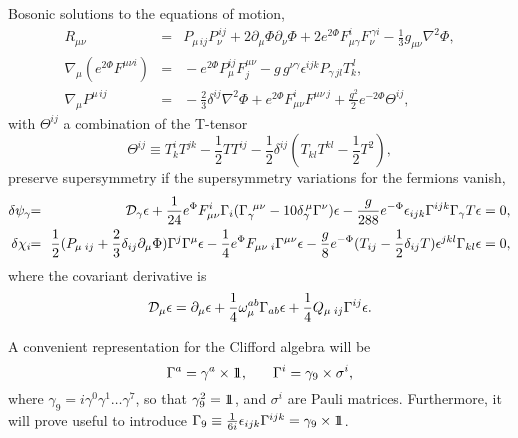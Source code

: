 \documentclass[12pt,a4paper]{article}
\begin{document}
Bosonic solutions to the equations of motion, 
\begin{eqnarray}
R_{\mu \nu} \! \! & = & \! \! P_{\mu \, ij} P_{\nu}^{\, ij} + 2 \partial_{\mu} \Phi \partial_{\nu} 
\Phi + 2 e^{2 \Phi} F_{\mu \gamma}^{i} F_{\nu}^{\, \gamma i} - \frac {1}{3} g_{\mu \nu} 
\nabla^2 \Phi, \nonumber \\
\nabla_{\mu}(e^{2 \Phi}F^{\mu \nu i}) \! \! & = & \! \! -e^{2 \Phi} P_{\mu}^{ij} F_j^{\mu \nu} - 
g \, g^{\nu \gamma} \epsilon^{ijk} P_{\gamma \, jl} T_k^{\, l}, \nonumber \\
\nabla_{\mu} P^{\mu \, ij} \! \! & = & \! \! - \frac {2}{3} \delta^{ij} \nabla^2 \Phi + 
e^{2 \Phi} F_{\mu \nu}^{i} F^{\mu \nu \, j} + \frac {g^2}{2} e^{-2 \Phi} \Theta^{ij},
\end{eqnarray}
with $\Theta^{ij}$ a combination of the T-tensor
\begin{equation}
\Theta^{ij} \equiv T^i_k T^{jk} - \frac {1}{2} T T^{ij} - \frac {1}{2} \delta^{ij} 
(T_{kl} T^{kl} - \frac {1}{2} T^2),
\end{equation}
preserve supersymmetry if the supersymmetry 
variations for the fermions vanish,
\begin{eqnarray}
\delta \psi_{\gamma} \! \! & = & \! \! {\cal D}_{\gamma} \epsilon + \frac {1}{24} e^{\Phi} F_{\mu \nu}^{i} 
\Gamma_i ( \Gamma_{\gamma}^{\: \: \mu \nu} - 10 \delta_{\gamma}^{\, \mu} \Gamma^{\nu}) \epsilon 
- \frac {g}{288} e^{- \Phi} \epsilon_{ijk} \Gamma^{ijk} \Gamma_{\gamma} T \epsilon = 0, \nonumber \\
\delta \chi_i \! \! & = & \! \! \frac {1}{2} (P_{\mu \; ij} + \frac {2}{3} \delta_{ij} \partial_{\mu} 
\Phi) \Gamma^{j} \Gamma^{\mu} \epsilon - \frac {1}{4} e^{\Phi} F_{\mu \nu \; i} 
\Gamma^{\mu \nu} \epsilon - \frac {g}{8} e^{-\Phi} (T_{ij} - \frac {1}{2} \delta_{ij} T) 
\epsilon^{jkl} \Gamma_{kl} \epsilon = 0,
\label{4}
\end{eqnarray}
where the covariant derivative is
\begin{equation}
{\cal D}_{\mu} \epsilon = \partial_{\mu} \epsilon + \frac {1}{4} \omega_{\mu}^{ab} \Gamma_{ab} 
\epsilon + \frac {1}{4} Q_{\mu \; ij} \Gamma^{ij} \epsilon.
\label{5}
\end{equation}
  
A convenient representation for the Clifford algebra will be
\begin{equation}
\Gamma^{a} = \gamma^{a} \times \relax{\rm 1\kern-.35em1}, \: \: \: \: \: \: \: \: \Gamma^{i} = \gamma_9 \times \sigma^{i},
\label{6}
\end{equation}
where $\gamma_9 = i \gamma^0 \gamma^1 \ldots \gamma^7$, so that $\gamma_9^2 = \relax{\rm 1\kern-.35em1}$, and $\sigma^{i}$ 
are Pauli matrices. Furthermore, it will prove useful to introduce 
$\Gamma_9 \equiv \frac {1}{6i} \epsilon_{ijk} \Gamma^{ijk} = \gamma_9 \times \relax{\rm 1\kern-.35em1}$.
  
\end{document}
